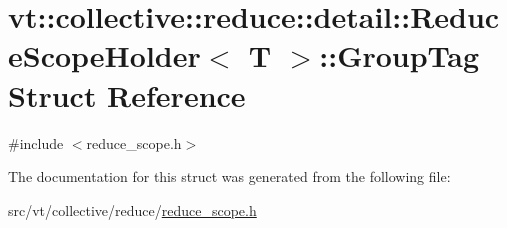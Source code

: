 \hypertarget{structvt_1_1collective_1_1reduce_1_1detail_1_1_reduce_scope_holder_1_1_group_tag}{}\section{vt\+:\+:collective\+:\+:reduce\+:\+:detail\+:\+:Reduce\+Scope\+Holder$<$ T $>$\+:\+:Group\+Tag Struct Reference}
\label{structvt_1_1collective_1_1reduce_1_1detail_1_1_reduce_scope_holder_1_1_group_tag}


{\ttfamily \#include $<$reduce\+\_\+scope.\+h$>$}



The documentation for this struct was generated from the following file\+:\begin{DoxyCompactItemize}
\item 
src/vt/collective/reduce/\hyperlink{reduce__scope_8h}{reduce\+\_\+scope.\+h}\end{DoxyCompactItemize}
